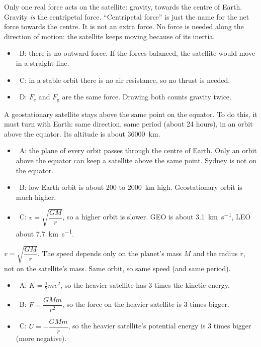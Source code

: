 \documentclass[12pt]{article}
\begin{document}
\begin{practiceanswers}[Worked answers]
\begin{practiceans}
  Only one real force acts on the satellite: gravity, towards the centre of Earth. Gravity
  \emph{is} the centripetal force. “Centripetal force” is just the name for the net force
  towards the centre. It is not an extra force. No force is needed along the direction of motion:
  the satellite keeps moving because of its inertia.
  \begin{itemize}
    \item \xmark\ B: there is no outward force. If the forces balanced, the satellite would move in a
          straight line.
    \item \xmark\ C: in a stable orbit there is no air resistance, so no thrust is needed.
    \item \xmark\ D: $F_\mathrm{c}$ and $F_\mathrm{g}$ are the same force. Drawing both counts gravity
          twice.
  \end{itemize}
\end{practiceans}

\begin{practiceans}
  A geostationary satellite stays above the same point on the equator. To do this, it must turn
  with Earth: same direction, same period (about 24 hours), in an orbit above the equator. Its
  altitude is about \qty{36000}{km}.
  \begin{itemize}
    \item \xmark\ A: the plane of every orbit passes through the centre of Earth. Only an orbit
          above the equator can keep a satellite above the same point. Sydney is not on the
          equator.
    \item \xmark\ B: low Earth orbit is about 200 to \qty{2000}{km} high. Geostationary orbit is
          much higher.
    \item \xmark\ C: $v = \sqrt{\dfrac{GM}{r}}$, so a higher orbit is slower. GEO is about
          \qty{3.1}{km.s^{-1}}, LEO about \qty{7.7}{km.s^{-1}}.
  \end{itemize}
\end{practiceans}

\begin{practiceans}
  $v = \sqrt{\dfrac{GM}{r}}$. The speed depends only on the planet's mass $M$ and the radius $r$,
  not on the satellite's mass. Same orbit, so same speed (and same period).
  \begin{itemize}
    \item \xmark\ A: $K = \frac{1}{2}mv^2$, so the heavier satellite has 3 times the kinetic energy.
    \item \xmark\ B: $F = \dfrac{GMm}{r^2}$, so the force on the heavier satellite is 3 times bigger.
    \item \xmark\ C: $U = -\dfrac{GMm}{r}$, so the heavier satellite's potential energy is 3 times bigger (more negative).
  \end{itemize}
\end{practiceans}


\end{practiceanswers}
\end{document}
